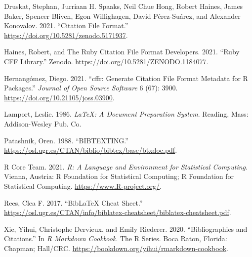 \documentclass[
]{article}
\newlength{\cslhangindent}
\newlength{\cslentryspacingunit} %
\newenvironment{CSLReferences}[2] %
 {%
  \setlength{\parindent}{0pt}
  \ifodd #1
  \let\oldpar\par
  \def\par{\hangindent=\cslhangindent\oldpar}
  \fi
  \setlength{\parskip}{#2\cslentryspacingunit}
 }%
 {}
\begin{document}
\hypertarget{refs}{}
\begin{CSLReferences}{1}{0}
\leavevmode{}%
Druskat, Stephan, Jurriaan H. Spaaks, Neil Chue Hong, Robert Haines,
James Baker, Spencer Bliven, Egon Willighagen, David Pérez-Suárez, and
Alexander Konovalov. 2021. {``Citation {File} {Format}.''}
\url{https://doi.org/10.5281/zenodo.5171937}.

\leavevmode{}%
Haines, Robert, and The Ruby Citation File Format Developers. 2021.
{``Ruby {CFF} Library.''} Zenodo.
\url{https://doi.org/10.5281/ZENODO.1184077}.

\leavevmode{}%
Hernangómez, Diego. 2021. {``{cffr}: Generate {Citation} {File} {Format}
Metadata for {R} Packages.''} \emph{Journal of Open Source Software} 6
(67): 3900. \url{https://doi.org/10.21105/joss.03900}.

\leavevmode{}%
Lamport, Leslie. 1986. \emph{{LaTeX}: A Document Preparation System}.
Reading, Mass: Addison-Wesley Pub. Co.

\leavevmode{}%
Patashnik, Oren. 1988. {``{BIBTEXTING}.''}
\url{https://osl.ugr.es/CTAN/biblio/bibtex/base/btxdoc.pdf}.

\leavevmode{}%
R Core Team. 2021. \emph{R: A Language and Environment for Statistical
Computing}. Vienna, Austria: R Foundation for Statistical Computing; R
Foundation for Statistical Computing. \url{https://www.R-project.org/}.

\leavevmode{}%
Rees, Clea F. 2017. {``{BibLaTeX} {Cheat} {Sheet}.''}
\url{https://osl.ugr.es/CTAN/info/biblatex-cheatsheet/biblatex-cheatsheet.pdf}.

\leavevmode{}%
Xie, Yihui, Christophe Dervieux, and Emily Riederer. 2020.
{``Bibliographies and Citations.''} In \emph{{R} Markdown Cookbook}. The
{R} Series. Boca Raton, Florida: Chapman; Hall/CRC.
\url{https://bookdown.org/yihui/rmarkdown-cookbook}.

\end{CSLReferences}
\end{document}
